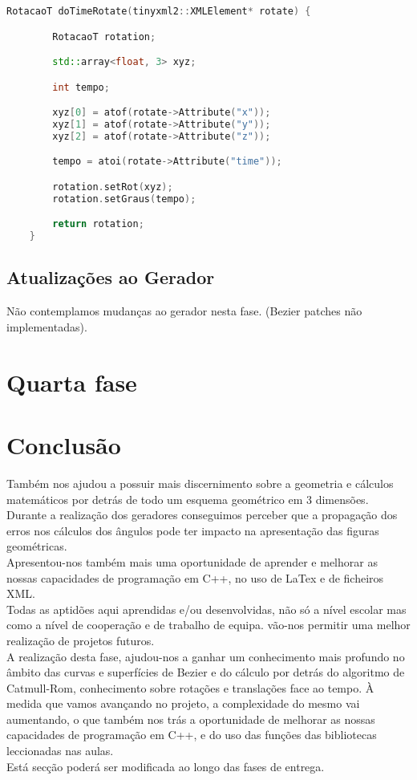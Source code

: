 \documentclass{article}
\begin{document}
\begin{file}
    \begin{lstlisting}[language=C++]
	RotacaoT doTimeRotate(tinyxml2::XMLElement* rotate) {

	    RotacaoT rotation;

	    std::array<float, 3> xyz;

	    int tempo;

	    xyz[0] = atof(rotate->Attribute("x"));
	    xyz[1] = atof(rotate->Attribute("y"));
	    xyz[2] = atof(rotate->Attribute("z"));

	    tempo = atoi(rotate->Attribute("time"));

	    rotation.setRot(xyz);
	    rotation.setGraus(tempo);

	    return rotation;
	}
    \end{lstlisting}
\end{file}

\subsection{Atualizações ao Gerador}
Não contemplamos mudanças ao gerador nesta fase. (Bezier patches não implementadas).

\newpage
\section{Quarta fase}

\subsection{}

\section{Conclusão}
Também nos ajudou a possuir mais discernimento sobre a geometria e cálculos matemáticos por detrás de todo um esquema geométrico em 3 dimensões.\\
Durante a realização dos geradores conseguimos perceber que a propagação dos erros nos cálculos dos ângulos pode ter impacto na apresentação das figuras geométricas.\\
Apresentou-nos também mais uma oportunidade de aprender e melhorar as nossas capacidades de programação em C++, no uso de LaTex e de ficheiros XML.\\
Todas as aptidões aqui aprendidas e/ou desenvolvidas, não só a nível escolar mas como a nível de cooperação e  de trabalho de equipa. vão-nos permitir uma melhor realização de projetos futuros.\\
A realização desta fase, ajudou-nos a ganhar um conhecimento mais profundo no âmbito das curvas e superfícies de Bezier e do cálculo por detrás do algoritmo de Catmull-Rom, conhecimento sobre rotações e translações face ao tempo. À medida que vamos avançando no projeto, a complexidade do mesmo vai aumentando, o que também nos trás a oportunidade de melhorar as nossas capacidades de programação em C++, e do uso das funções das bibliotecas leccionadas nas aulas.\\
Está secção poderá ser modificada ao longo das fases de entrega.\\
\end{document}
